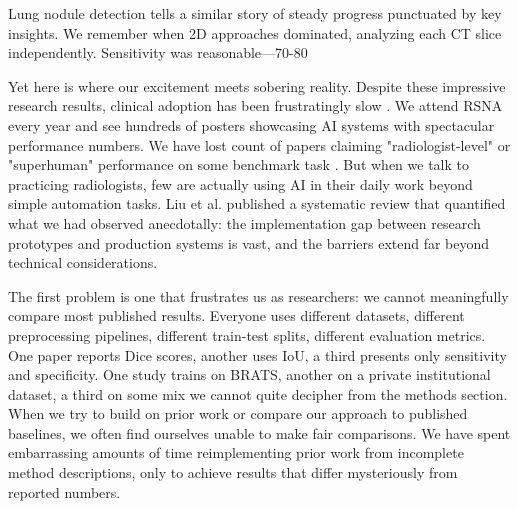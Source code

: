 \documentclass[12pt,a4paper]{article}
\begin{document}
Lung nodule detection tells a similar story of steady progress punctuated by key insights. We remember when 2D approaches dominated, analyzing each CT slice independently. Sensitivity was reasonable—70-80%

Yet here is where our excitement meets sobering reality. Despite these impressive research results, clinical adoption has been frustratingly slow \cite{rajpurkar2022ai}. We attend RSNA every year and see hundreds of posters showcasing AI systems with spectacular performance numbers. We have lost count of papers claiming "radiologist-level" or "superhuman" performance on some benchmark task \cite{esteva2017dermatologist, mckinney2020international}. But when we talk to practicing radiologists, few are actually using AI in their daily work beyond simple automation tasks. Liu et al. \cite{liu2019comparison} published a systematic review that quantified what we had observed anecdotally: the implementation gap between research prototypes and production systems is vast, and the barriers extend far beyond technical considerations.

The first problem is one that frustrates us as researchers: we cannot meaningfully compare most published results. Everyone uses different datasets, different preprocessing pipelines, different train-test splits, different evaluation metrics. One paper reports Dice scores, another uses IoU, a third presents only sensitivity and specificity. One study trains on BRATS, another on a private institutional dataset, a third on some mix we cannot quite decipher from the methods section. When we try to build on prior work or compare our approach to published baselines, we often find ourselves unable to make fair comparisons. We have spent embarrassing amounts of time reimplementing prior work from incomplete method descriptions, only to achieve results that differ mysteriously from reported numbers.
\end{document}
